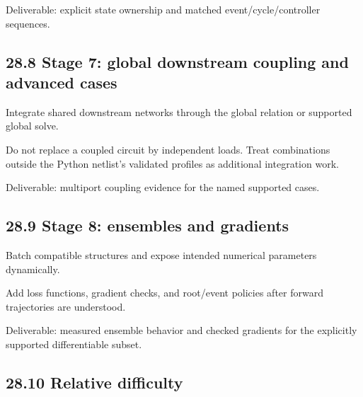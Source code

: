\documentclass[11pt,a4paper]{article}
\begin{document}
Deliverable: explicit state ownership and matched event/cycle/controller sequences.

\subsection{28.8 Stage 7: global downstream coupling and advanced cases}
Integrate shared downstream networks through the global relation or supported global solve.

Do not replace a coupled circuit by independent loads. Treat combinations outside the Python netlist's validated profiles as additional integration work.

Deliverable: multiport coupling evidence for the named supported cases.

\subsection{28.9 Stage 8: ensembles and gradients}
Batch compatible structures and expose intended numerical parameters dynamically.

Add loss functions, gradient checks, and root/event policies after forward trajectories are understood.

Deliverable: measured ensemble behavior and checked gradients for the explicitly supported differentiable subset.

\subsection{28.10 Relative difficulty}
\end{document}
